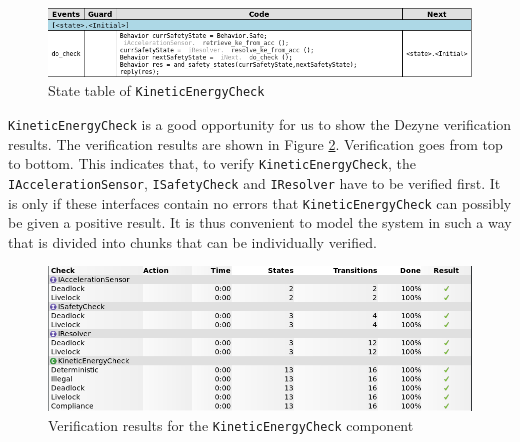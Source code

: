 \documentclass[12pt]{scrreprt}
\begin{document}
\begin{figure}[H]
    \centering
    \includegraphics[width=\textwidth]{Figures/results/modelling_figures/KineticEnergyCheck/KineticEnergyCheck_state_table.png}
    \caption{State table of \texttt{KineticEnergyCheck}}
    \label{fig:KineticEnergyCheck_state_table}
\end{figure}

\texttt{KineticEnergyCheck} is a good opportunity for us to show the Dezyne verification results. The verification results are shown in Figure \ref{fig:kineticenergycheck_verification}. Verification goes from top to bottom. This indicates that, to verify \texttt{KineticEnergyCheck}, the \texttt{IAccelerationSensor}, \texttt{ISafetyCheck} and \texttt{IResolver} have to be verified first. It is only if these interfaces contain no errors that \texttt{KineticEnergyCheck} can possibly be given a positive result. It is thus convenient to model the system in such a way that is divided into chunks that can be individually verified.

\begin{figure}[H]
    \centering
    \includegraphics[width=\textwidth]{Figures/results/modelling_figures/KineticEnergyCheck/KineticEnergyCheck_verification.png}
    \caption{Verification results for the \texttt{KineticEnergyCheck} component}
    \label{fig:kineticenergycheck_verification}
\end{figure}
\end{document}
